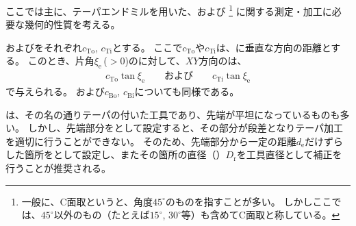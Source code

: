 

ここでは主に、テーパエンドミルを用いた、\textbf{\EndFaceOutCChamfer}および\textbf{\EndFaceInCChamfer}%
\footnote{一般に、C面取というと、角度$45^\circ$のものを指すことが多い。
しかしここでは、$45^\circ$以外のもの（たとえば$15^\circ$, $30^\circ$等）も含めてC面取と称している。}
に関する測定・加工に必要な幾何的性質を考える。



\TopEndFaceOutCChamferLength および\TopEndFaceInCChamferLength をそれぞれ$c_\mathrm{To}$, $c_\mathrm{Ti}$とする。
ここで$c_\mathrm{To}$や$c_\mathrm{Ti}$は、\EndFace に垂直な方向の距離とする。
このとき、片角$\xi_\mathrm e$\,($>0$)の\TaperEndMill に対して、$XY$方向の\EndFaceCChamferLength は、
\begin{align*}
  c_\mathrm{To}\tan\xi_\mathrm e\qquad\text{および}\qquad c_\mathrm{Ti}\tan\xi_\mathrm e
\end{align*}
で与えられる。
\BottomEndFaceOutCChamferLength および\TopEndFaceInCChamferLength$c_\mathrm{Bo}$, $c_\mathrm{Bi}$についても同様である。



\TaperEndMill は、その名の通りテーパの付いた工具であり、先端が平坦になっているものも多い。
しかし、先端部分を\ToolLength として設定すると、その部分が段差となりテーパ加工を適切に行うことができない。
そのため、先端部分から一定の距離$d_\mathrm e$だけずらした箇所を\indexTLTaperEndMill\nameToolLength として設定し、またその箇所の直径（\textbf{\TaperEndMillReferenceDiameter}）$D_\mathrm r$を工具直径として補正を行うことが推奨される。

